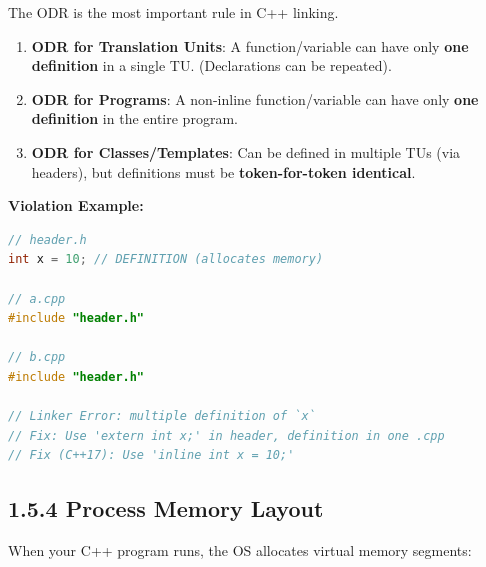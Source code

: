 The ODR is the most important rule in C++ linking.

\begin{enumerate}
\def\labelenumi{\arabic{enumi}.}
\tightlist
\item
  \textbf{ODR for Translation Units}: A function/variable can have only
  \textbf{one definition} in a single TU. (Declarations can be
  repeated).
\item
  \textbf{ODR for Programs}: A non-inline function/variable can have
  only \textbf{one definition} in the entire program.
\item
  \textbf{ODR for Classes/Templates}: Can be defined in multiple TUs
  (via headers), but definitions must be \textbf{token-for-token
  identical}.
\end{enumerate}

\textbf{Violation Example:}

\begin{lstlisting}[language={C++}]
// header.h
int x = 10; // DEFINITION (allocates memory)

// a.cpp
#include "header.h"

// b.cpp
#include "header.h"

// Linker Error: multiple definition of `x`
// Fix: Use 'extern int x;' in header, definition in one .cpp
// Fix (C++17): Use 'inline int x = 10;'
\end{lstlisting}

\hypertarget{process-memory-layout}{%
\subsection{1.5.4 Process Memory Layout}\label{process-memory-layout}}

When your C++ program runs, the OS allocates virtual memory segments:

